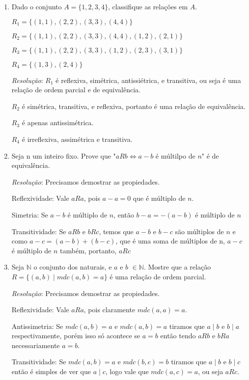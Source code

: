 \begin{enumerate}
    \item Dado o conjunto $A = \{1,2,3,4\}$, classifique as relações em $A$.
    
    $R_{1} = \{(1,1),(2,2),(3,3),(4,4)\}$
    
    $R_{2} = \{(1,1),(2,2),(3,3),(4,4),(1,2),(2,1)\}$
    
    $R_{3} = \{(1,1),(2,2),(3,3),(1,2),(2,3),(3,1)\}$
    
    $R_{4} = \{(1,3),(2,4)\}$
    
    \textit{Resolução}: $R_{1}$ é reflexiva, simétrica, antissiétrica, e transitiva, ou seja é uma relação de ordem parcial e de equivalência.
    
    $R_{2}$ é simétrica, transitiva, e reflexiva, portanto é uma relação de equivalência.
    
    $R_{3}$ é apenas antissimétrica.
    
    $R_{4}$ é irreflexiva, assimétrica e transitiva.
    
    \item Seja n um inteiro fixo. Prove que "$aRb \Leftrightarrow a-b$ é múltilpo de $n$" é de equivalência.
    
    \textit{Resolução}: Precisamos demostrar as propiedades.
    
    Reflexividade: Vale $aRa$, pois $a-a=0$ que é múltiplo de $n$.
    
    Simetria: Se $a-b$ é múltiplo de $n$, então $b-a=-(a-b)$ é múltiplo de $n$
    
    Transitividade: Se $aRb$ e $bRc$, temos que $a-b$ e $b-c$ são múltiplos de $n$ e como $a-c = (a-b)+(b-c)$, que é uma soma de múltiplos de n, $a-c$ é múltiplo de $n$ também, portanto, $aRc$ 
    
    \item Seja $\mathbb{N}$ o conjunto dos naturais, e $a$ e $b$ $\in \mathbb{N}$. Mostre que a relação $R = \{(a, b)   \mid  mdc(a,b) = a\}$ é uma relação de ordem parcial.
    
    \textit{Resolução}: Precisamos demostrar as propiedades.
    
    Reflexividade: Vale $aRa$, pois claramente $mdc(a,a)=a$.
    
    Antissimetria: Se $mdc(a,b)=a$ e $mdc(a,b)=a$ tiramos que $a \mid b$ e $b \mid a$ respectivamente, porém isso só acontece se $a=b$ então tendo $aRb$ e $bRa$ necessariamente $a=b$.
    
    Transitividade: Se $mdc(a,b)=a$ e $mdc(b,c)=b$ tiramos que $a \mid b$ e $b \mid c$ então é simples de ver que $a \mid c$, logo vale que $mdc(a,c)=a$, ou seja $aRc$.
    

\end{enumerate}
